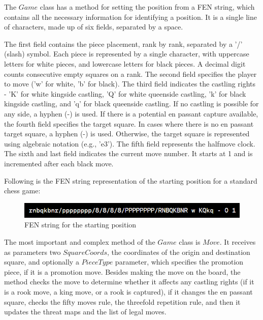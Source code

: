 The $Game$ class has a method for setting the position from a FEN string, which contains all the necessary information for identifying a position. It is a single line of characters, made up of six fields, separated by a space.

The first field contains the piece placement, rank by rank, separated by a '/' (slash) symbol. Each piece is represented by a single character, with uppercase letters for white pieces, and lowercase letters for black pieces. A decimal digit counts consecutive empty squares on a rank. The second field specifies the player to move ('w' for white, 'b' for black). The third field indicates the castling rights - 'K' for white kingside castling, 'Q' for white queenside castling, 'k' for black kingside castling, and 'q' for black queenside castling. If no castling is possible for any side, a hyphen (-) is used. If there is a potential en passant capture available, the fourth field specifies the target square. In cases where there is no en passant target square, a hyphen (-) is used. Otherwise, the target square is represented using algebraic notation (e.g., 'e3'). The fifth field represents the halfmove clock. The sixth and last field indicates the current move number. It starts at 1 and is incremented after each black move.

Following is the FEN string representation of the starting position for a standard chess game:

\begin{figure}[h]
    \centering
    \includegraphics[width=1\textwidth]{figures/starting-position-fen.png}
    \caption{FEN string for the starting position}
    \label{fig:fenStartingPosition}
\end{figure}

The most important and complex method of the $Game$ class is $Move$. It receives as parameters two $SquareCoords$, the coordinates of the origin and destination square, and optionally a $PieceType$ parameter, which specifies the promotion piece, if it is a promotion move. Besides making the move on the board, the method checks the move to determine whether it affects any castling rights (if it is a rook move, a king move, or a rook is captured), if it changes the en passant square, checks the fifty moves rule, the threefold repetition rule, and then it updates the threat maps and the list of legal moves.

